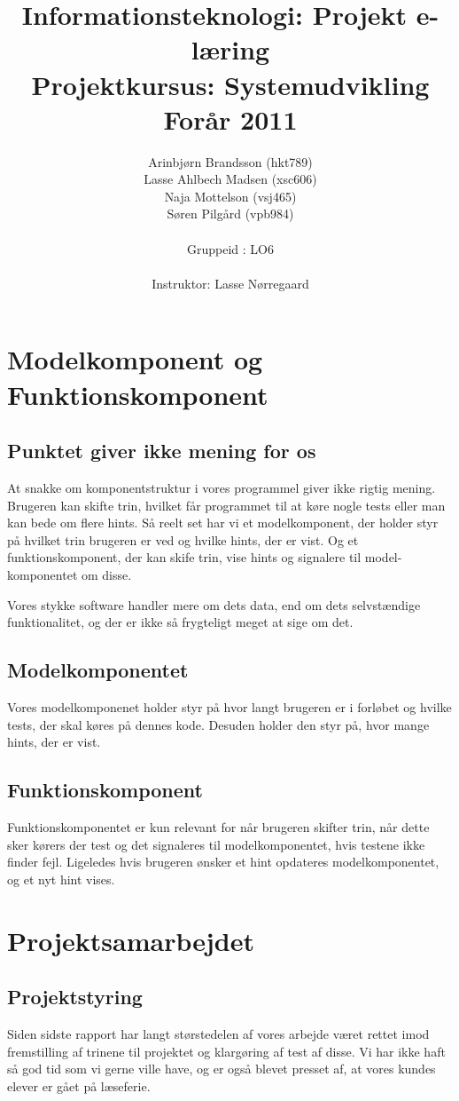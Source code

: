 \documentclass[10pt,a4paper,danish]{article}
\title{Informationsteknologi: Projekt e-læring \\ Projektkursus: Systemudvikling \\Forår 2011}
\author{Arinbjørn Brandsson (hkt789)\\Lasse Ahlbech Madsen (xsc606)\\Naja Mottelson (vsj465)\\Søren Pilgård (vpb984)\\
\\
Gruppeid : LO6\\
\\Instruktor: Lasse Nørregaard}
\begin{document}
\maketitle
\newpage

\tableofcontents
\newpage



\section{Modelkomponent og Funktionskomponent}
\subsection{Punktet giver ikke mening for os}
At snakke om komponentstruktur i vores programmel giver ikke rigtig mening.
Brugeren kan skifte trin, hvilket får programmet til at køre nogle tests eller
man kan bede om flere hints. Så reelt set har vi et modelkomponent, der holder
styr på hvilket trin brugeren er ved og hvilke hints, der er vist. Og et
funktionskomponent, der kan skife trin, vise hints og signalere til model-
komponentet om disse.

Vores stykke software handler mere om dets data, end om dets selvstændige
funktionalitet, og der er ikke så frygteligt meget at sige om det.


\subsection{Modelkomponentet}
Vores modelkomponenet holder styr på hvor langt brugeren er i forløbet og
hvilke tests, der skal køres på dennes kode. Desuden holder den styr på, hvor
mange hints, der er vist.

\subsection{Funktionskomponent}
Funktionskomponentet er kun relevant for når brugeren skifter trin, når dette
sker kørers der test og det signaleres til modelkomponentet, hvis testene ikke
finder fejl. Ligeledes hvis brugeren ønsker et hint opdateres modelkomponentet,
og et nyt hint vises.

\section{Projektsamarbejdet}
\subsection{Projektstyring}
Siden sidste rapport har langt størstedelen af vores arbejde været rettet imod
fremstilling af trinene til projektet og klargøring af test af disse. Vi har
ikke haft så god tid som vi gerne ville have, og er også blevet presset af, at
vores kundes elever er gået på læseferie. 
\end{document}
